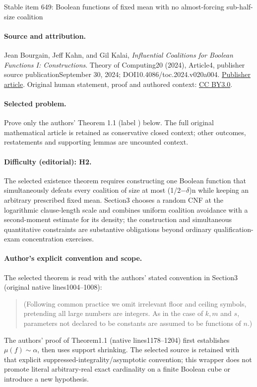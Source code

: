 \documentclass[11pt]{article}
\numberwithin{equation}{section}
\theoremstyle{definition}
\theoremstyle{plain}
\newcommand{\0}[0]{\emptyset}
\begin{document}
\begin{center}{\Large Stable item 649: Boolean functions of fixed mean with no almost-forcing sub-half-size coalition}\end{center}
\paragraph{Source and attribution.}
Jean Bourgain, Jeff Kahn, and Gil Kalai, \emph{Influential Coalitions for Boolean Functions I: Constructions}. Theory of Computing20 (2024), Article4, publisher source publicationSeptember 30, 2024; DOI10.4086/toc.2024.v020a004. \href{https://theoryofcomputing.org/articles/v020a004/}{Publisher article}. Original human statement, proof and authored context: \href{https://creativecommons.org/licenses/by/3.0/}{CC BY3.0}.
\paragraph{Selected problem.}
Prove only the authors' Theorem 1.1 (label ) below. The full original mathematical article is retained as conservative closed context; other outcomes, restatements and supporting lemmas are uncounted context.
\paragraph{Difficulty (editorial): H2.}
The selected existence theorem requires constructing one Boolean function that simultaneously defeats every coalition of size at most (1/2−\(\delta\))n while keeping an arbitrary prescribed fixed mean. Section3 chooses a random CNF at the logarithmic clause-length scale and combines uniform coalition avoidance with a second-moment estimate for its density; the construction and simultaneous quantitative constraints are substantive obligations beyond ordinary qualification-exam concentration exercises.
\paragraph{Author's explicit convention and scope.}
The selected theorem is read with the authors' stated convention in Section3 (original native lines1004--1008):
\begin{quote}
(Following common practice we omit irrelevant
floor and ceiling symbols,
pretending all large numbers are integers.
As in the case of $k,m$ and $s$, parameters not declared
to be constants are assumed to be functions of $n$.)
\end{quote}
The authors' proof of Theorem1.1 (native lines1178--1204) first establishes \(\mu(f)\sim\alpha\), then uses support shrinking. The selected source is retained with that explicit suppressed-integrality/asymptotic convention; this wrapper does not promote literal arbitrary-real exact cardinality on a finite Boolean cube or introduce a new hypothesis.
\end{document}
